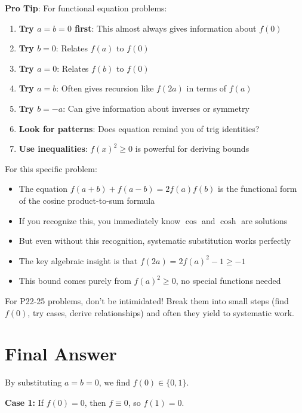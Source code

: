 \documentclass[12pt]{article}
\begin{document}
\begin{tipbox}
\textbf{Pro Tip}: For functional equation problems:

\begin{enumerate}
    \item \textbf{Try $a = b = 0$ first}: This almost always gives information about $f(0)$
    \item \textbf{Try $b = 0$}: Relates $f(a)$ to $f(0)$
    \item \textbf{Try $a = 0$}: Relates $f(b)$ to $f(0)$
    \item \textbf{Try $a = b$}: Often gives recursion like $f(2a)$ in terms of $f(a)$
    \item \textbf{Try $b = -a$}: Can give information about inverses or symmetry
    \item \textbf{Look for patterns}: Does equation remind you of trig identities?
    \item \textbf{Use inequalities}: $f(x)^2 \geq 0$ is powerful for deriving bounds
\end{enumerate}

For this specific problem:
\begin{itemize}
    \item The equation $f(a+b) + f(a-b) = 2f(a)f(b)$ is the functional form of the cosine product-to-sum formula
    \item If you recognize this, you immediately know $\cos$ and $\cosh$ are solutions
    \item But even without this recognition, systematic substitution works perfectly
    \item The key algebraic insight is that $f(2a) = 2f(a)^2 - 1 \geq -1$
    \item This bound comes purely from $f(a)^2 \geq 0$, no special functions needed
\end{itemize}

For P22-25 problems, don't be intimidated! Break them into small steps (find $f(0)$, try cases, derive relationships) and often they yield to systematic work.
\end{tipbox}

\section*{Final Answer}

By substituting $a = b = 0$, we find $f(0) \in \{0, 1\}$.

\textbf{Case 1:} If $f(0) = 0$, then $f \equiv 0$, so $f(1) = 0$.
\end{document}
